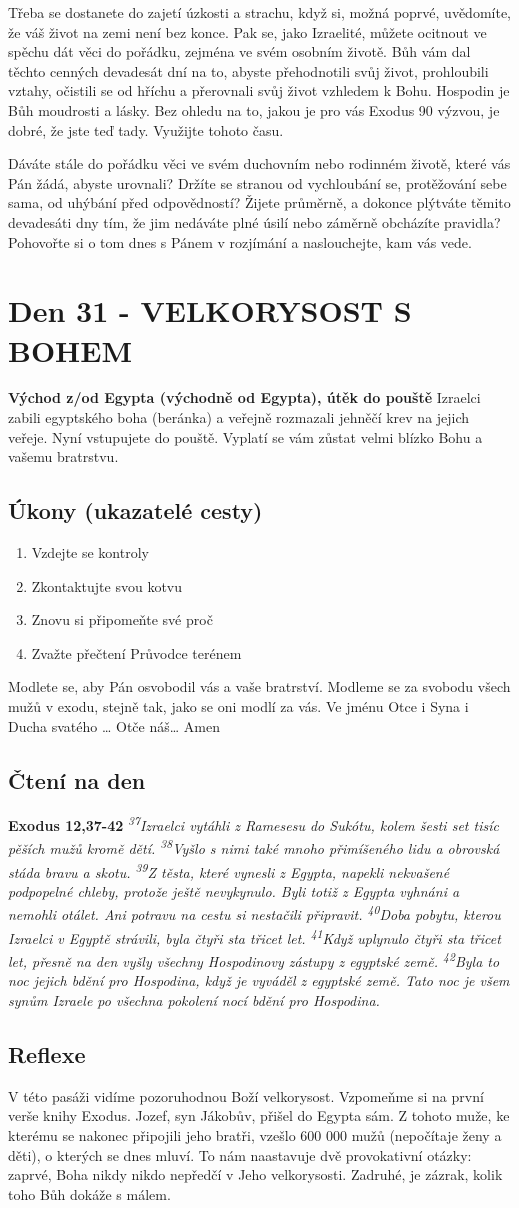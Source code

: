 \documentclass[11pt]{article}
\newcommand{\zacatekPatyTyden}{
  \textbf{Východ z/od Egypta (východně od Egypta), útěk do pouště} \newline
  Izraelci zabili egyptského boha (beránka) a veřejně rozmazali jehněčí krev na jejich veřeje. Nyní vstupujete
  do pouště. Vyplatí se vám zůstat velmi blízko Bohu a vašemu bratrstvu.

\subsection*{Úkony (ukazatelé cesty)}
\begin{enumerate}
  \item Vzdejte se kontroly
  \item Zkontaktujte svou kotvu
  \item Znovu si připomeňte své proč
  \item Zvažte přečtení Průvodce terénem
\end{enumerate}
Modlete se, aby Pán osvobodil vás a vaše bratrství. \newline
Modleme se za svobodu všech mužů v exodu, stejně tak, jako se oni modlí za vás.\newline
Ve jménu Otce i Syna i Ducha svatého …  Otče náš… Amen
}
\begin{document}
Třeba se dostanete do zajetí úzkosti a strachu, když si, možná poprvé, uvědomíte, že váš život na zemi není bez konce.
Pak se, jako Izraelité, můžete ocitnout ve spěchu dát věci do pořádku, zejména ve svém osobním životě. Bůh vám dal
těchto cenných devadesát dní na to, abyste přehodnotili svůj život, prohloubili vztahy, očistili se od hříchu a přerovnali
svůj život vzhledem k Bohu. Hospodin je Bůh moudrosti a lásky. Bez ohledu na to, jakou je pro vás Exodus 90
výzvou, je dobré, že jste teď tady. Využijte tohoto času.

Dáváte stále do pořádku věci ve svém duchovním nebo rodinném životě, které vás Pán žádá, abyste urovnali? Držíte se
stranou od vychloubání se, protěžování sebe sama, od uhýbání před odpovědností? Žijete průměrně, a dokonce plýtváte
těmito devadesáti dny tím, že jim nedáváte plné úsilí nebo záměrně obcházíte pravidla? Pohovořte si o tom dnes
s Pánem v rozjímání a naslouchejte, kam vás vede.


\newpage
\section{Den 31 - VELKORYSOST S BOHEM}
\zacatekPatyTyden
\subsection*{Čtení na den}
\textbf{Exodus 12,37-42}
\newline
\textit{
\textsuperscript{37}Izraelci vytáhli z Ramesesu do Sukótu, kolem šesti set tisíc pěších mužů kromě dětí.
\textsuperscript{38}Vyšlo s nimi také mnoho přimíšeného lidu a obrovská stáda bravu a skotu.
\textsuperscript{39}Z těsta, které vynesli z Egypta, napekli nekvašené podpopelné chleby, protože ještě nevykynulo. Byli totiž z Egypta vyhnáni a nemohli otálet. Ani potravu na cestu si nestačili připravit.
\textsuperscript{40}Doba pobytu, kterou Izraelci v Egyptě strávili, byla čtyři sta třicet let.
\textsuperscript{41}Když uplynulo čtyři sta třicet let, přesně na den vyšly všechny Hospodinovy zástupy z egyptské země.
\textsuperscript{42}Byla to noc jejich bdění pro Hospodina, když je vyváděl z egyptské země. Tato noc je všem synům Izraele po všechna pokolení nocí bdění pro Hospodina.
}

\subsection*{Reflexe}
V této pasáži vidíme pozoruhodnou Boží velkorysost. Vzpomeňme si na první verše knihy Exodus. Jozef, syn Jákobův,
přišel do Egypta sám. Z tohoto muže, ke kterému se nakonec připojili jeho bratři, vzešlo 600 000 mužů (nepočítaje
ženy a děti), o kterých se dnes mluví. To nám naastavuje dvě provokativní otázky: zaprvé, Boha nikdy nikdo nepředčí
v Jeho velkorysosti. Zadruhé, je zázrak, kolik toho Bůh dokáže s málem.
\end{document}
